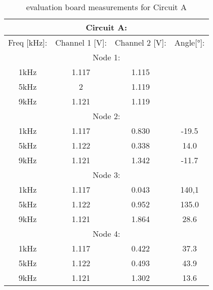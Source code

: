 \documentclass[notitlepage, a4paper, 11pt]{article}
\begin{document}
		\begin{table}[hbt!] %
		\begin{center}
			\begin{tabular}{|c|c|c|c|}
				\hline
				\multicolumn{4}{|c|}{\textbf{Circuit A:}} \\
				\hline\hline
				Freq [kHz]: & Channel 1 [V]: & Channel 2 [V]: & Angle[°]: \\
				\hline
				\multicolumn{4}{|c|}{Node 1:   } \\
				\hline
				1kHz & 1.117 & 1.115 &   \\
				\hline
				5kHz & 2&1.119 &   \\
				\hline
				9kHz & 1.121 & 1.119 &   \\
				\hline
				\multicolumn{4}{|c|}{Node 2:   } \\
				\hline
				1kHz & 1.117 & 0.830 & -19.5 \\
				\hline
				5kHz & 1.122 & 0.338 & 14.0 \\
				\hline
				9kHz & 1.121 & 1.342 & -11.7 \\
				\hline
				\multicolumn{4}{|c|}{Node 3:   } \\
				\hline
				1kHz & 1.117 & 0.043 & 140,1 \\
				\hline
				5kHz & 1.122 & 0.952 & 135.0 \\
				\hline
				9kHz & 1.121 & 1.864 & 28.6 \\
				\hline
				\multicolumn{4}{|c|}{Node 4:   } \\
				\hline
				1kHz & 1.117 & 0.422 & 37.3 \\
				\hline
				5kHz & 1.122 & 0.493 & 43.9 \\
				\hline
				9kHz & 1.121 & 1.302 & 13.6 \\
				\hline
			\end{tabular}
		\end{center}
		\caption{evaluation board measurements for Circuit A}
	\end{table}
\end{document}
